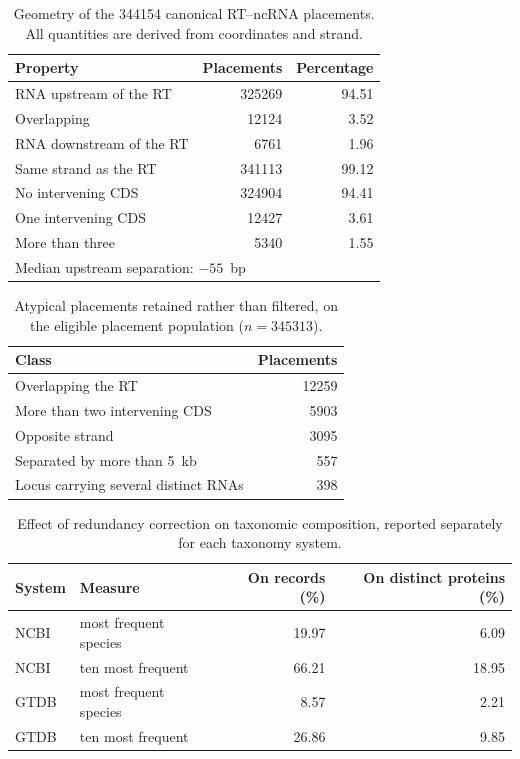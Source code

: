 \begin{table}[htbp]
\centering
\caption[Geometry of canonical RT--ncRNA placements]{Geometry of the \num{344154} canonical
RT--ncRNA placements. All quantities are derived from coordinates and strand.}
\label{tab:geometry}
\begin{tabular}{lrr}
\toprule
Property & Placements & Percentage \\
\midrule
RNA upstream of the RT    & \num{325269} & 94.51 \\
Overlapping               & \num{12124}  & 3.52 \\
RNA downstream of the RT  & \num{6761}   & 1.96 \\
\midrule
Same strand as the RT     & \num{341113} & 99.12 \\
No intervening CDS        & \num{324904} & 94.41 \\
One intervening CDS       & \num{12427}  & 3.61 \\
More than three           & \num{5340}   & 1.55 \\
\midrule
\multicolumn{3}{l}{Median upstream separation: $-55$~bp} \\
\bottomrule
\end{tabular}
\end{table}

\begin{table}[htbp]
\centering
\caption[Atypical placements retained]{Atypical placements retained rather than filtered, on the
eligible placement population ($n=\num{345313}$).}
\label{tab:atypical}
\begin{tabular}{lr}
\toprule
Class & Placements \\
\midrule
Overlapping the RT                      & \num{12259} \\
More than two intervening CDS           & \num{5903} \\
Opposite strand                         & \num{3095} \\
Separated by more than 5~kb             & 557 \\
Locus carrying several distinct RNAs    & 398 \\
\bottomrule
\end{tabular}
\end{table}

\begin{table}[htbp]
\centering
\caption[Effect of redundancy correction on taxonomic composition]{Effect of redundancy correction
on taxonomic composition, reported separately for each taxonomy system.}
\label{tab:redundancy}
\begin{tabular}{llrr}
\toprule
System & Measure & On records (\%) & On distinct proteins (\%) \\
\midrule
NCBI & most frequent species    & 19.97 & 6.09 \\
NCBI & ten most frequent        & 66.21 & 18.95 \\
GTDB & most frequent species    & 8.57  & 2.21 \\
GTDB & ten most frequent        & 26.86 & 9.85 \\
\bottomrule
\end{tabular}
\end{table}

